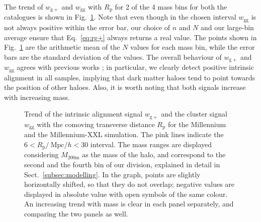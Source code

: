 \documentclass[a4paper,11pt]{article}
\begin{document}
The trend of $w_{\mathrm{g+}}$ and $w_{\mathrm{gg}}$ with $R_{\mathrm{p}}$ for 2 of the 4 mass bins for both the catalogues is shown in Fig.~\ref{fig:wgpwggrp}. Note that even though in the chosen interval $w_{\mathrm{gg}}$ is not always positive within the error bar, our choice of $n$ and $N$ and our large-bin average ensure that Eq.~\ref{eq:rg+} always returns a real value. The points shown in Fig.~\ref{fig:wgpwggrp} are the arithmetic mean of the $N$ values for each mass bin, while the error bars are the standard deviation of the values. The overall behaviour of $w_{\mathrm{g+}}$ and $w_{\mathrm{gg}}$ agrees with previous works \cite{Joachimietal2011, vanUitertJoachimi2017}; in particular, we clearly detect positive intrinsic alignment in all samples, implying that dark matter haloes tend to point towards the position of other haloes. Also, it is worth noting that both signals increase with increasing mass.
\begin{figure}
	\centerline{
	}
	\centerline{
	}
	\caption{Trend of the intrinsic alignment signal $w_{\mathrm{g+}}$ and the cluster signal $w_{\mathrm{gg}}$ with the comoving transverse distance $R_{\mathrm{p}}$ for \protect{} the Millennium and \protect{} the Millennium-XXL simulation. The pink lines indicate the $6 < R_{\mathrm{p}} / \ \mbox{Mpc}/h < 30 $ interval. The mass ranges are displayed considering $M_{\mathrm{200m}}$ as the mass of the halo, and correspond to the second and the fourth bin of our division, explained in detail in Sect.~\ref{subsec:modelling}. In the graph, points are slightly horizontally shifted, so that they do not overlap; negative values are displayed in absolute value with open symbols of the same colour. An increasing trend with mass is clear in each panel separately, and comparing the two panels as well.}
	\label{fig:wgpwggrp}
\end{figure}
\end{document}
